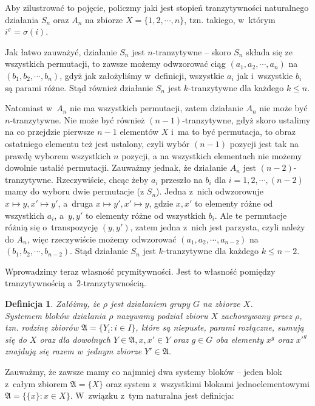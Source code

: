 \documentclass[licencjacka]{pracamgr}
\newtheorem{deff}{Definicja}[section]
\begin{document}
Aby zilustrować to pojęcie, policzmy jaki jest stopień tranzytywności naturalnego działania
$S_n$ oraz $A_n$ na zbiorze $X = \{1, 2, \cdots,
n\}$, tzn. takiego, w~którym $i^\sigma = \sigma(i)$.

Jak łatwo zauważyć, działanie $S_n$ jest $n$-tranzytywne -- skoro
$S_n$ składa się ze wszystkich permutacji, to zawsze możemy
odwzorować ciąg $(a_1, a_2, \cdots, a_n)$ na $(b_1, b_2, \cdots,
b_n)$, gdyż jak założyliśmy w~definicji, wszystkie $a_i$ jak
i~wszystkie $b_i$ są parami różne. Stąd również działanie $S_n$ jest
$k$-tranzytywne dla każdego $k \le n$.

Natomiast w~$A_n$ nie ma wszystkich permutacji, zatem działanie
$A_n$ nie może być $n$-tranzytywne. Nie może być również
$(n-1)$-tranzytywne, gdyż skoro ustalimy na co przejdzie pierwsze $n-1$
elementów $X$ i~ma to być permutacja, to obraz ostatniego elementu
też jest ustalony, czyli wybór $(n-1)$ pozycji jest tak na prawdę
wyborem wszystkich $n$ pozycji, a na wszystkich elementach nie
możemy dowolnie ustalić permutacji. Zauważmy jednak, że działanie
$A_n$ jest $(n-2)$-tranzytywne. Rzeczywiście, chcąc żeby $a_i$
przeszło na $b_i$ dla $i = 1, 2, \cdots, (n-2)$ mamy do wyboru dwie
permutacje (z $S_n$). Jedna z~nich odwzorowuje $x \mapsto y, x'
\mapsto y'$, a~druga $x \mapsto y', x' \mapsto y$, gdzie $x, x'$ to
elementy różne od wszystkich  $a_i$, a~$y, y'$ to elementy różne od wszystkich
$b_i$. Ale te permutacje różnią się o~transpozycję $(y, y')$, zatem
jedna z~nich jest parzysta, czyli należy do $A_n$, więc rzeczywiście
możemy odwzorować $(a_1, a_2, \cdots, a_{n-2})$ na $(b_1, b_2,
\cdots, b_{n-2})$. Stąd działanie $S_n$ jest $k$-tranzytywne dla
każdego $k \le n-2$.

Wprowadzimy teraz własność prymitywności. Jest to własność pomiędzy
tranzytywnością a~$2$-tranzytywnością.

\begin{deff}
    Załóżmy, że $\rho$ jest działaniem grupy $G$ na zbiorze $X$. \\
    \emph{Systemem bloków} działania $\rho$ nazywamy podział zbioru $X$ zachowywany przez $\rho$,
    tzn. rodzinę zbiorów $\mathfrak{A} = \{Y_i \colon i \in I \}$, które są niepuste, parami rozłączne, sumują się do $X$
    oraz dla dowolnych $Y \in \mathfrak{A}, x, x' \in Y$ oraz $g \in G$
    oba elementy $x^g$ oraz $x'^g$ znajdują się razem w~jednym zbiorze $Y' \in \mathfrak{A}$.
\end{deff}

Zauważmy, że zawsze mamy co najmniej dwa systemy bloków -- jeden
blok z~całym zbiorem $\mathfrak{A} = \{X\}$ oraz system z~wszystkimi
blokami jednoelementowymi $\mathfrak{A} = \{\{x\} \colon x \in X\}$.
W~związku z~tym naturalna jest definicja:
\end{document}
